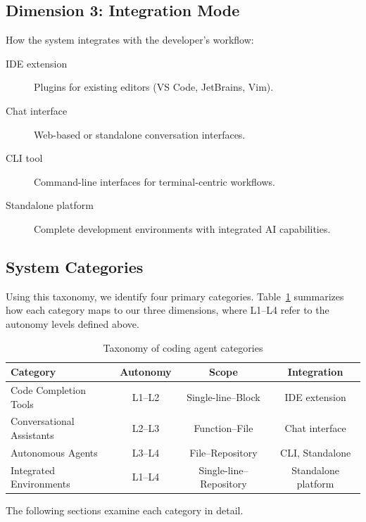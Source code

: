 \subsection{Dimension 3: Integration Mode}

How the system integrates with the developer's workflow:

\begin{description}
    \item[IDE extension] Plugins for existing editors (VS Code, JetBrains, Vim).
    \item[Chat interface] Web-based or standalone conversation interfaces.
    \item[CLI tool] Command-line interfaces for terminal-centric workflows.
    \item[Standalone platform] Complete development environments with integrated AI capabilities.
\end{description}

\subsection{System Categories}

Using this taxonomy, we identify four primary categories. Table~\ref{tab:taxonomy} summarizes how each category maps to our three dimensions, where L1--L4 refer to the autonomy levels defined above.

\begin{table}[h]
\centering
\caption{Taxonomy of coding agent categories}
\label{tab:taxonomy}
\begin{tabular}{lccc}
\toprule
\textbf{Category} & \textbf{Autonomy} & \textbf{Scope} & \textbf{Integration} \\
\midrule
Code Completion Tools & L1--L2 & Single-line--Block & IDE extension \\
Conversational Assistants & L2--L3 & Function--File & Chat interface \\
Autonomous Agents & L3--L4 & File--Repository & CLI, Standalone \\
Integrated Environments & L1--L4 & Single-line--Repository & Standalone platform \\
\bottomrule
\end{tabular}
\end{table}

The following sections examine each category in detail.
